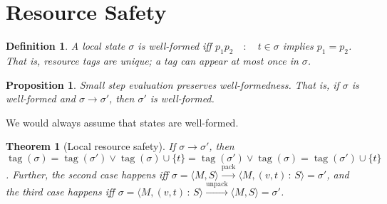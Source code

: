 \documentclass{article}
\newcommand{\colons}{\,:\,}
\newcommand{\tmop}[1]{\ensuremath{\operatorname{#1}}}
\newcommand{\tmxspace}{\hspace{1em}}
\newtheorem{definition}{Definition}
\newtheorem{proposition}{Proposition}
\newtheorem{theorem}{Theorem}
\begin{document}
\section{Resource Safety}

\begin{definition}
  A local state $\sigma$ is well-formed iff $p_1 p_2 \tmxspace : \tmxspace t
  \in \sigma$ implies $p_1 = p_2$. That is, resource tags are unique; a tag
  can appear at most once in $\sigma$.
\end{definition}

\begin{proposition}
  Small step evaluation preserves well-formedness. That is, if $\sigma$ is
  well-formed and $\sigma \rightarrow \sigma'$, then $\sigma'$ is well-formed.
\end{proposition}

We would always assume that states are well-formed.

\begin{theorem}[Local resource safety]
  If $\sigma \rightarrow \sigma'$, then $\tmop{tag} (\sigma) = \tmop{tag}
  (\sigma') \vee \tmop{tag} (\sigma) \cup \{ t \} = \tmop{tag} (\sigma') \vee
  \tmop{tag} (\sigma) = \tmop{tag} (\sigma') \cup \{ t \}$. Further, the
  second case happens iff $\sigma = \langle M, S \rangle
  \xrightarrow{\tmop{pack}} \langle M, (v, t) \colons S \rangle = \sigma'$,
  and the third case happens iff $\sigma = \langle M, (v, t) \colons S \rangle
  \xrightarrow{\tmop{unpack}} \langle M, S \rangle = \sigma'$.
\end{theorem}
\end{document}
